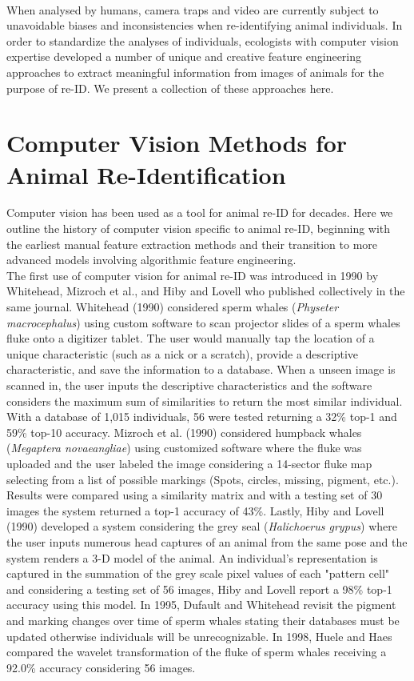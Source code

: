\documentclass[11pt]{article}
\begin{document}
\newline
\\
When analysed by humans, camera traps and video are currently subject to unavoidable biases and inconsistencies when re-identifying animal individuals. In order to standardize the analyses of individuals, ecologists with computer vision expertise developed a number of unique and creative feature engineering approaches to extract meaningful information from images of animals for the purpose of re-ID. We present a collection of these approaches here.

\section*{Computer Vision Methods for Animal Re-Identification}

Computer vision has been used as a tool for animal re-ID for decades. Here we outline the history of computer vision specific to animal re-ID, beginning with the earliest manual feature extraction methods and their transition to more advanced models involving algorithmic feature engineering.
\newline
\\
The first use of computer vision for animal re-ID was introduced in 1990 by Whitehead, Mizroch et al., and Hiby and Lovell who published collectively in the same journal. Whitehead (1990) considered sperm whales (\textit{Physeter macrocephalus}) using custom software to scan projector slides of a sperm whales fluke onto a digitizer tablet. The user would manually tap the location of a unique characteristic (such as a nick or a scratch), provide a descriptive characteristic, and save the information to a database. When a unseen image is scanned in, the user inputs the descriptive characteristics and the software considers the maximum sum of similarities to return the most similar individual. With a database of 1,015 individuals, 56 were tested returning a 32\% top-1 and 59\% top-10 accuracy. Mizroch et al. (1990) considered humpback whales (\textit{Megaptera novaeangliae}) using customized software where the fluke was uploaded and the user labeled the image considering a 14-sector fluke map selecting from a list of possible markings (Spots, circles, missing, pigment, etc.). Results were compared using a similarity matrix and with a testing set of 30 images the system returned a top-1 accuracy of 43\%. Lastly, Hiby and Lovell (1990) developed a system considering the grey seal (\textit{Halichoerus grypus}) where the user inputs numerous head captures of an animal from the same pose and the system renders a 3-D model of the animal. An individual's representation is captured in the summation of the grey scale pixel values of each "pattern cell" and considering a testing set of 56 images, Hiby and Lovell report a 98\% top-1 accuracy using this model. In 1995, Dufault and Whitehead revisit the pigment and marking changes over time of sperm whales stating their databases must be updated otherwise individuals will be unrecognizable. In 1998, Huele and Haes compared the wavelet transformation of the fluke of sperm whales receiving a 92.0\% accuracy considering 56 images.
\end{document}
